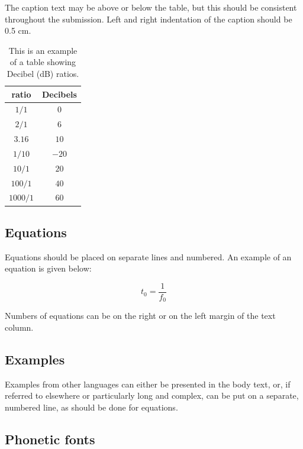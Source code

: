 \documentclass[a4paper,11pt,twocolumn]{article}
\begin{document}
The caption text may be above or below the table, but this should be
consistent throughout the submission. Left and right indentation of the
caption should be 0.5 cm.

\begin{table}[!ht]
  \caption{This is an example of a table showing Decibel (dB) ratios.}
  \label{tab:decibel}
  \begin{center}
  \begin{tabular}{|c|c|}
  \hline
  \rowcolor[gray]{.75}
  ratio    & Decibels \\
  \hline
  $1/1$    & $0$      \\
  $2/1$    & $6$      \\
  $3.16$   & $10$     \\
  $1/10$   & $-20$    \\
  $10/1$   & $20$     \\
  $100/1$  & $40$     \\
  $1000/1$ & $60$     \\
  \hline
  \end{tabular}
  \end{center}
\end{table}

\subsection{Equations}

Equations should be placed on separate lines and numbered. An example of
an equation is given below:

\begin{equation}\label{eq:tzero}
  t_0 = \frac{1}{f_0}
\end{equation}

\noindent Numbers of equations can be on the right or on the left margin
of the text column.

\subsection{Examples}

Examples from other languages can either be presented in the body text,
or, if referred to elsewhere or particularly long and complex, can be
put on a separate, numbered line, as should be done for equations.

\subsection{Phonetic fonts}
\end{document}
